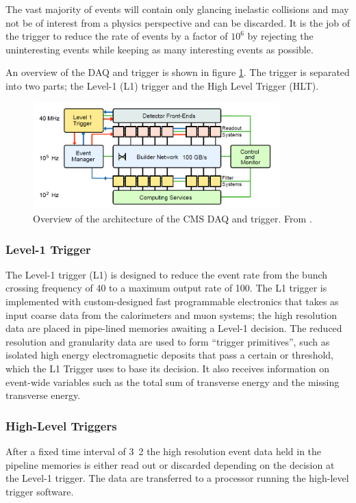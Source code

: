 The vast majority of events will contain only glancing inelastic collisions and
may not be of interest from a physics perspective and can be discarded.  It is
the job of the trigger to reduce the rate of events by a factor of $10^6$ by
rejecting the uninteresting events while keeping as many interesting events as
possible.

An overview of the {DAQ} and trigger is shown in figure \ref{fig:CMSDAQ}.
The trigger is separated into two parts; the Level-1 (L1) trigger and the High
Level Trigger (HLT).\cite{chatrchyan2008cms}

\begin{figure}[htbp]
  \centering
  \includegraphics[width=0.85\textwidth]{CMSDAQ}
  \caption[Overview of the architecture of the CMS DAQ and trigger.] {Overview
of the architecture of the CMS DAQ and trigger. From \label{fig:CMSDAQ}
\cite{chatrchyan2008cms}.}
\end{figure}

\subsubsection{Level-1 Trigger}

The Level-1 trigger (L1) is designed to reduce the event rate from the bunch
crossing frequency of \unit{40}{\mega\hertz} to a maximum output rate of
\unit{100}{\kilo\hertz}.  The L1 trigger is implemented with custom-designed
fast programmable electronics that takes as input coarse data from the
calorimeters and muon systems; the high resolution data are placed in pipe-lined
memories awaiting a Level-1 decision. The reduced resolution and granularity data are used to form ``trigger
primitives'', such as isolated high energy electromagnetic deposits that pass a
certain \PT or \ET threshold, which the L1 Trigger uses to base its decision. It
also receives information on event-wide variables such as the total sum of
transverse energy and the missing transverse energy.

\subsubsection{High-Level Triggers}
After a fixed time interval of \unit{3.2}{\micro\second} the high resolution
event data held in the pipeline memories is either read out or discarded
depending on the decision at the Level-1 trigger.  The data are transferred to a
processor running the high-level trigger software.


